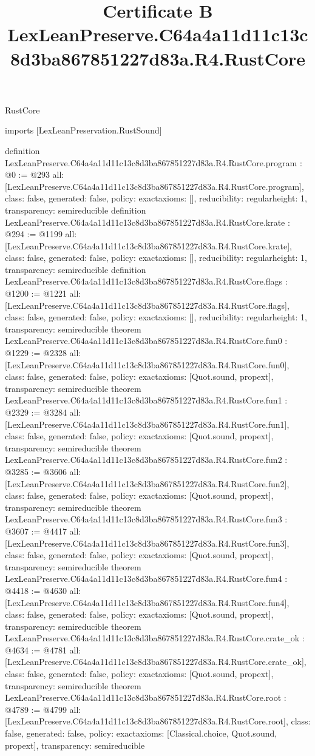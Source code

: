 \begin{lexlean}{RustCore}
\title{Certificate B LexLeanPreserve.C64a4a11d11c13c8d3ba867851227d83a.R4.RustCore}
\begin{coremodule}
imports [LexLeanPreservation.RustSound]

definition LexLeanPreserve.C64a4a11d11c13c8d3ba867851227d83a.R4.RustCore.program : @0 := @293 {
  all: [LexLeanPreserve.C64a4a11d11c13c8d3ba867851227d83a.R4.RustCore.program],
  class: false,
  generated: false,
  policy: exact{axioms: []},
  reducibility: regular{height: 1},
  transparency: semireducible
}
definition LexLeanPreserve.C64a4a11d11c13c8d3ba867851227d83a.R4.RustCore.krate : @294 := @1199 {
  all: [LexLeanPreserve.C64a4a11d11c13c8d3ba867851227d83a.R4.RustCore.krate],
  class: false,
  generated: false,
  policy: exact{axioms: []},
  reducibility: regular{height: 1},
  transparency: semireducible
}
definition LexLeanPreserve.C64a4a11d11c13c8d3ba867851227d83a.R4.RustCore.flags : @1200 := @1221 {
  all: [LexLeanPreserve.C64a4a11d11c13c8d3ba867851227d83a.R4.RustCore.flags],
  class: false,
  generated: false,
  policy: exact{axioms: []},
  reducibility: regular{height: 1},
  transparency: semireducible
}
theorem LexLeanPreserve.C64a4a11d11c13c8d3ba867851227d83a.R4.RustCore.fun0 : @1229 := @2328 {
  all: [LexLeanPreserve.C64a4a11d11c13c8d3ba867851227d83a.R4.RustCore.fun0],
  class: false,
  generated: false,
  policy: exact{axioms: [Quot.sound, propext]},
  transparency: semireducible
}
theorem LexLeanPreserve.C64a4a11d11c13c8d3ba867851227d83a.R4.RustCore.fun1 : @2329 := @3284 {
  all: [LexLeanPreserve.C64a4a11d11c13c8d3ba867851227d83a.R4.RustCore.fun1],
  class: false,
  generated: false,
  policy: exact{axioms: [Quot.sound, propext]},
  transparency: semireducible
}
theorem LexLeanPreserve.C64a4a11d11c13c8d3ba867851227d83a.R4.RustCore.fun2 : @3285 := @3606 {
  all: [LexLeanPreserve.C64a4a11d11c13c8d3ba867851227d83a.R4.RustCore.fun2],
  class: false,
  generated: false,
  policy: exact{axioms: [Quot.sound, propext]},
  transparency: semireducible
}
theorem LexLeanPreserve.C64a4a11d11c13c8d3ba867851227d83a.R4.RustCore.fun3 : @3607 := @4417 {
  all: [LexLeanPreserve.C64a4a11d11c13c8d3ba867851227d83a.R4.RustCore.fun3],
  class: false,
  generated: false,
  policy: exact{axioms: [Quot.sound, propext]},
  transparency: semireducible
}
theorem LexLeanPreserve.C64a4a11d11c13c8d3ba867851227d83a.R4.RustCore.fun4 : @4418 := @4630 {
  all: [LexLeanPreserve.C64a4a11d11c13c8d3ba867851227d83a.R4.RustCore.fun4],
  class: false,
  generated: false,
  policy: exact{axioms: [Quot.sound, propext]},
  transparency: semireducible
}
theorem LexLeanPreserve.C64a4a11d11c13c8d3ba867851227d83a.R4.RustCore.crate_ok : @4634 := @4781 {
  all: [LexLeanPreserve.C64a4a11d11c13c8d3ba867851227d83a.R4.RustCore.crate_ok],
  class: false,
  generated: false,
  policy: exact{axioms: [Quot.sound, propext]},
  transparency: semireducible
}
theorem LexLeanPreserve.C64a4a11d11c13c8d3ba867851227d83a.R4.RustCore.root : @4789 := @4799 {
  all: [LexLeanPreserve.C64a4a11d11c13c8d3ba867851227d83a.R4.RustCore.root],
  class: false,
  generated: false,
  policy: exact{axioms: [Classical.choice, Quot.sound, propext]},
  transparency: semireducible
}


\end{coremodule}
\end{lexlean}
